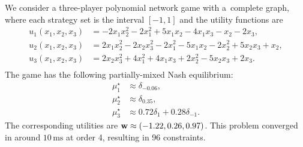 \begin{example}\label{ex:separable.network}

    We consider a three-player polynomial network game with a~complete graph, where each strategy set is the interval $[-1,1]$ and the utility functions are
    \begin{equation*}\begin{aligned}
        u_{1}(x_{1},x_{2},x_{3}) &= -2x_{1}x_{2}^2 - 2x_{1}^2 + 5x_{1}x_{2} - 4x_{1}x_{3} - x_{2} - 2x_{3},\\
        u_{2}(x_{1},x_{2},x_{3}) &= 2x_{1}x_{2}^2 - 2x_{2}x_{3}^2 - 2x_{1}^2 - 5x_{1}x_{2} - 2x_{2}^2 + 5x_{2}x_{3} + x_{2},\\
        u_{3}(x_{1},x_{2},x_{3}) &= 2x_{2}x_{3}^2 + 4x_{1}^2 + 4x_{1}x_{3} + 2x_{2}^2 - 5x_{2}x_{3} + 2x_{3}.\\
    \end{aligned}\end{equation*}
    The game has the following partially-mixed Nash equilibrium:
    \[
    \begin{aligned}
        \mu^\star_1 &\approx \delta_{-0.06},\\
        \mu^\star_2 &\approx \delta_{0.35},\\
        \mu^\star_3 &\approx 0.72\delta_{1} + 0.28\delta_{-1}.
    \end{aligned}
    \]
    The corresponding utilities are $\mathbf{w} \approx (-1.22, 0.26, 0.97)$. This problem converged in around $10\,\text{ms}$ at order 4, resulting in 96 constraints.
\end{example}

